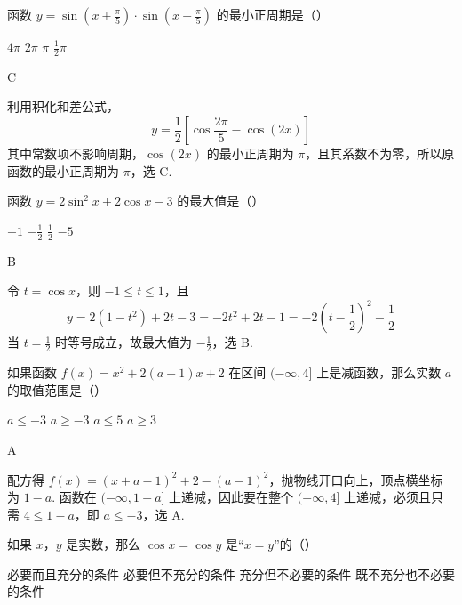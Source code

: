 \begin{problem}
函数 \(y=\sin\left(x+\frac{\pi}{5}\right)\cdot\sin\left(x-\frac{\pi}{5}\right)\) 的最小正周期是（\quad）

\choices
    {\(4\pi\)}
    {\(2\pi\)}
    {\(\pi\)}
    {\(\frac{1}{2}\pi\)}
\end{problem}

\begin{answer}
C
\end{answer}

\begin{solution}
利用积化和差公式，
\[
y=\frac12\left[\cos\frac{2\pi}{5}-\cos(2x)\right]
\]
其中常数项不影响周期，\(\cos(2x)\) 的最小正周期为 \(\pi\)，且其系数不为零，所以原函数的最小正周期为 \(\pi\)，选 C.
\end{solution}

\begin{problem}
函数 \(y=2\sin^2 x+2\cos x-3\) 的最大值是（\quad）

\choices
    {\(-1\)}
    {\(-\frac{1}{2}\)}
    {\(\frac{1}{2}\)}
    {\(-5\)}
\end{problem}

\begin{answer}
B
\end{answer}

\begin{solution}
令 \(t=\cos x\)，则 \(-1\leqslant t\leqslant1\)，且
\[
y=2(1-t^2)+2t-3=-2t^2+2t-1=-2\left(t-\frac12\right)^2-\frac12
\]
当 \(t=\frac12\) 时等号成立，故最大值为 \(-\frac12\)，选 B.
\end{solution}

\begin{problem}
如果函数 \(f(x)=x^2+2(a-1)x+2\) 在区间 \((-\infty,4]\) 上是减函数，那么实数 \(a\) 的取值范围是（\quad）

\choices
    {\(a\leqslant -3\)}
    {\(a\geqslant -3\)}
    {\(a\leqslant 5\)}
    {\(a\geqslant 3\)}
\end{problem}

\begin{answer}
A
\end{answer}

\begin{solution}
配方得 \(f(x)=(x+a-1)^2+2-(a-1)^2\)，抛物线开口向上，顶点横坐标为 \(1-a\). 函数在 \((-\infty,1-a]\) 上递减，因此要在整个 \((-\infty,4]\) 上递减，必须且只需 \(4\leqslant1-a\)，即 \(a\leqslant-3\)，选 A.
\end{solution}

\begin{problem}
如果 \(x\)，\(y\) 是实数，那么 \(\cos x=\cos y\) 是“\(x=y\)”的（\quad）

\choices
    {必要而且充分的条件}
    {必要但不充分的条件}
    {充分但不必要的条件}
    {既不充分也不必要的条件}
\end{problem}

